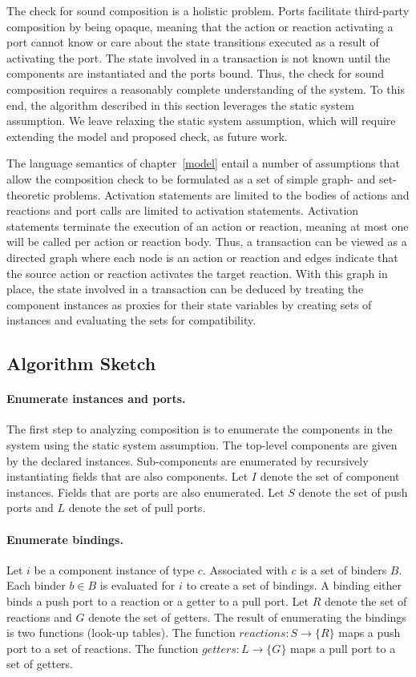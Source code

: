 The check for sound composition is a holistic problem.
Ports facilitate third-party composition by being opaque, meaning that the action or reaction activating a port cannot know or care about the state transitions executed as a result of activating the port.
The state involved in a transaction is not known until the components are instantiated and the ports bound.
Thus, the check for sound composition requires a reasonably complete understanding of the system.
To this end, the algorithm described in this section leverages the static system assumption.
We leave relaxing the static system assumption, which will require extending the model and proposed check, as future work.

The language semantics of chapter~\ref{model} entail a number of assumptions that allow the composition check to be formulated as a set of simple graph- and set-theoretic problems.
Activation statements are limited to the bodies of actions and reactions and port calls are limited to activation statements.
Activation statements terminate the execution of an action or reaction, meaning at most one will be called per action or reaction body.
Thus, a transaction can be viewed as a directed graph where each node is an action or reaction and edges indicate that the source action or reaction activates the target reaction.
With this graph in place, the state involved in a transaction can be deduced by treating the component instances as proxies for their state variables by creating sets of instances and evaluating the sets for compatibility.

\subsection{Algorithm Sketch}

\paragraph{Enumerate instances and ports.}
The first step to analyzing composition is to enumerate the components in the system using the static system assumption.
The top-level components are given by the declared instances.
Sub-components are enumerated by recursively instantiating fields that are also components.
Let $I$ denote the set of component instances.
Fields that are ports are also enumerated.
Let $S$ denote the set of push ports and $L$ denote the set of pull ports.

\paragraph{Enumerate bindings.}
Let $i$ be a component instance of type $c$.
Associated with $c$ is a set of binders $B$.
Each binder $b \in B$ is evaluated for $i$ to create a set of bindings.
A binding either binds a push port to a reaction or a getter to a pull port.
Let $R$ denote the set of reactions and $G$ denote the set of getters.
The result of enumerating the bindings is two functions (look-up tables).
The function $reactions: S \to \{ R \}$ maps a push port to a set of reactions.
The function $getters: L \to \{ G \}$ maps a pull port to a set of getters.

